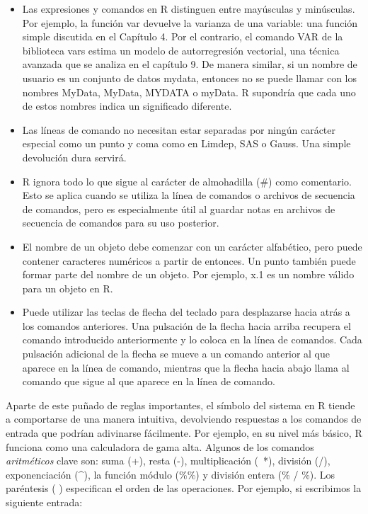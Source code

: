 \documentclass[
]{book}
\providecommand{\tightlist}{%
  \setlength{\itemsep}{0pt}\setlength{\parskip}{0pt}}
\begin{document}
\begin{itemize}
\tightlist
\item
  Las expresiones y comandos en R distinguen entre mayúsculas y minúsculas. Por ejemplo, la función var devuelve la varianza de una variable: una función simple discutida en el Capítulo 4. Por el contrario, el comando VAR de la biblioteca vars estima un modelo de autorregresión vectorial, una técnica avanzada que se analiza en el capítulo 9. De manera similar, si un nombre de usuario es un conjunto de datos mydata, entonces no se puede llamar con los nombres MyData, MyData, MYDATA o myData. R supondría que cada uno de estos nombres indica un significado diferente.
\item
  Las líneas de comando no necesitan estar separadas por ningún carácter especial como un punto y coma como en Limdep, SAS o Gauss. Una simple devolución dura servirá.
\item
  R ignora todo lo que sigue al carácter de almohadilla (\#) como comentario. Esto se aplica cuando se utiliza la línea de comandos o archivos de secuencia de comandos, pero es especialmente útil al guardar notas en archivos de secuencia de comandos para su uso posterior.
\item
  El nombre de un objeto debe comenzar con un carácter alfabético, pero puede contener caracteres numéricos a partir de entonces. Un punto también puede formar parte del nombre de un objeto. Por ejemplo, x.1 es un nombre válido para un objeto en R.
\item
  Puede utilizar las teclas de flecha del teclado para desplazarse hacia atrás a los comandos anteriores. Una pulsación de la flecha hacia arriba recupera el comando introducido anteriormente y lo coloca en la línea de comandos. Cada pulsación adicional de la flecha se mueve a un comando anterior al que aparece en la línea de comando, mientras que la flecha hacia abajo llama al comando que sigue al que aparece en la línea de comando.
\end{itemize}

Aparte de este puñado de reglas importantes, el símbolo del sistema en R tiende a comportarse de una manera intuitiva, devolviendo respuestas a los comandos de entrada que podrían adivinarse fácilmente. Por ejemplo, en su nivel más básico, R funciona como una calculadora de gama alta. Algunos de los comandos \emph{aritméticos} clave son: suma (+), resta (-), multiplicación (~*), división (/), exponenciación (\^{}), la función módulo (\%\%) y división entera (\% / \%). Los paréntesis ( ) especifican el orden de las operaciones. Por ejemplo, si escribimos la siguiente entrada:
\end{document}
